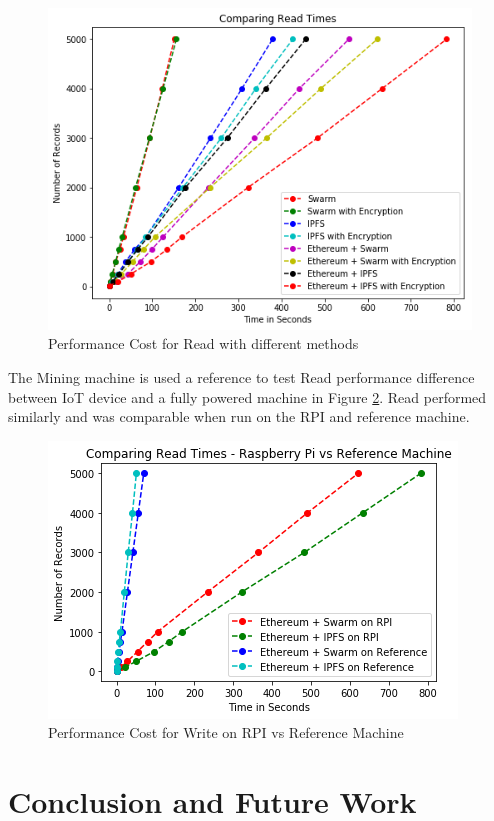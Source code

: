 \documentclass[11pt,openright]{report}
\begin{document}
\begin{figure}
    \centering
    \includegraphics[scale=0.8]{results/graphs/ReadComp.png}
    \caption{Performance Cost for Read with different methods}
    \label{fig:graph_perf_cost_read}
\end{figure}

The Mining machine is used a reference to test Read performance difference between IoT device and a fully powered machine in Figure \ref{fig:graph_perf_cost_read_pi_ref}. Read performed similarly and was comparable when run on the RPI and reference machine.
\begin{figure}
    \centering
    \includegraphics[scale=1]{results/graphs/ReadComp_Pi_v_Ref.png}
    \caption{Performance Cost for Write on RPI vs Reference Machine}
    \label{fig:graph_perf_cost_read_pi_ref}
\end{figure}

\chapter{Conclusion and Future Work} \label{chapter:conclusion}
\end{document}
